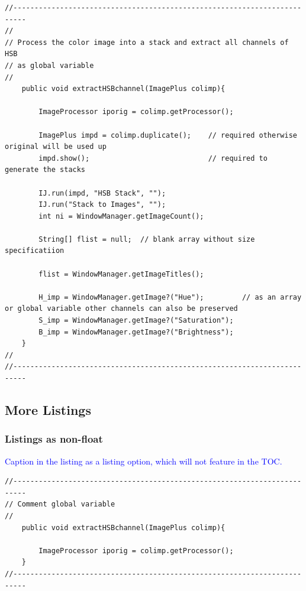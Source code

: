 \documentclass[phd]{ndsu-thesis-2022}
\newcommand\italk[1]{\textcolor{blue}{#1}}  %
\begin{document}
{\singlespacing
\begin{lstlisting}
//-------------------------------------------------------------------------
//
// Process the color image into a stack and extract all channels of HSB 
// as global variable
//
	public void extractHSBchannel(ImagePlus colimp){

		ImageProcessor iporig = colimp.getProcessor();
		
		ImagePlus impd = colimp.duplicate();	// required otherwise original will be used up
		impd.show();						    // required to generate the stacks
		
		IJ.run(impd, "HSB Stack", "");
		IJ.run("Stack to Images", "");
		int ni = WindowManager.getImageCount();

		String[] flist = null;  // blank array without size specificatiion

		flist = WindowManager.getImageTitles();
		
		H_imp = WindowManager.getImage?("Hue");			// as an array or global variable other channels can also be preserved
		S_imp = WindowManager.getImage?("Saturation");
		B_imp = WindowManager.getImage?("Brightness");
	}	
//
//-------------------------------------------------------------------------	
\end{lstlisting}
}

\subsection{More Listings}

\subsubsection{Listings as non-float}

\italk{Caption in the listing as a listing option, which will not feature in the TOC.}

{\singlespacing
\begin{lstlisting}[frameround=fttt, caption = {Caption in listing as option.}, captionpos=b]
//-------------------------------------------------------------------------
// Comment global variable
//
	public void extractHSBchannel(ImagePlus colimp){

		ImageProcessor iporig = colimp.getProcessor();
	}	
//-------------------------------------------------------------------------	
\end{lstlisting}
}
\end{document}
